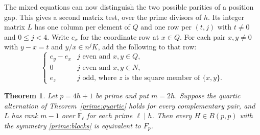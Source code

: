 \documentclass[11pt,a4paper]{article}
\newtheorem{theorem}{Theorem}[section]
\numberwithin{equation}{section}
\begin{document}
The mixed equations can now distinguish the two possible parities of a position gap. This gives a second matrix test, over the prime divisors of $h$. Its integer matrix $L$ has one column per element of $Q$ and one row per $(t,j)$ with $t\ne0$ and $0\le j<4$. Write $e_x$ for the coordinate row at $x\in Q$. For each pair $x,y\ne0$ with $y-x=t$ and $y/x\in n^jK$, add the following to that row:
\[
 \begin{cases}
 e_y-e_x & j\text{ even and } x,y\in Q,\\
 0 & j\text{ even and }x,y\in N,\\
 e_z & j\text{ odd, where }z\text{ is the square member of }\{x,y\}.
 \end{cases}
\]

\begin{theorem}\label{prime:even-ranks}
Let $p=4h+1$ be prime and put $m=2h$. Suppose the quartic alternation of Theorem~\ref{prime:quartic} holds for every complementary pair, and $L$ has rank $m-1$ over $\mathbb F_\ell$ for each prime $\ell\mid h$. Then every $H\in B(p,p)$ with the symmetry \eqref{prime:blocks} is equivalent to $F_p$.
\end{theorem}
\end{document}
